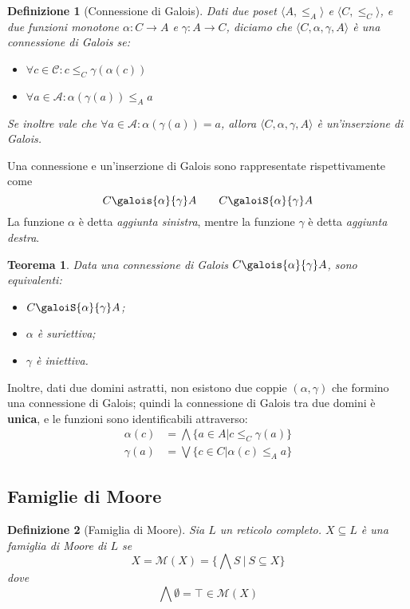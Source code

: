 \documentclass[a4paper, 11pt]{article}
\newcommand{\galoistuple}{\langle C, \alpha, \gamma , A \rangle}
\newtheorem{definit}{Definizione}[subsection]
\newtheorem{thm}{Teorema}[subsection]
\begin{document}
	\begin{definit}[Connessione di Galois]
		Dati due poset $\langle A , \leq_A \rangle$ e $\langle C , \leq_C \rangle$, e due funzioni monotone $\alpha: C \to A$ e $\gamma: A \to C$, diciamo che $\galoistuple$ è una connessione di Galois se:
		\begin{itemize}
			\item $\forall c \in \mathcal{C}: c \leq_C \gamma(\alpha(c))$
			\item $\forall a \in \mathcal{A}: \alpha(\gamma(a)) \leq_A a$
		\end{itemize}
		
		Se inoltre vale che $\forall a \in \mathcal{A}: \alpha(\gamma(a)) = a$, allora $\galoistuple$ è un'inserzione di Galois.
	\end{definit}
	Una connessione e un'inserzione di Galois sono rappresentate rispettivamente come \[  C \galois{\alpha}{\gamma} A \qquad C \galoiS{\alpha}{\gamma} A \]
	La funzione $\alpha$ è detta \textit{aggiunta sinistra}, mentre la funzione $\gamma$ è detta \textit{aggiunta destra}.
	
	\begin{thm}
		Data una connessione di Galois $ C \galois{\alpha}{\gamma} A$, sono equivalenti:
		\begin{itemize}
			\item $C \galoiS{\alpha}{\gamma} A$;
			\item $\alpha$ è suriettiva;
			\item $\gamma$ è iniettiva.
		\end{itemize}
	\end{thm}

	Inoltre, dati due domini astratti, non esistono due coppie $(\alpha, \gamma)$ che formino una connessione di Galois; quindi la connessione di Galois tra due domini è \textbf{unica}, e le funzioni sono identificabili attraverso:
	\begin{align*}
		\alpha(c) &= \bigwedge \lbrace a \in A \vert c \leq_C \gamma(a) \rbrace \\
		\gamma(a) &= \bigvee \lbrace c \in C \vert \alpha(c) \leq_A a \rbrace
	\end{align*}
	
	\subsection{Famiglie di Moore}
	\begin{definit}[Famiglia di Moore]
		Sia $L$ un reticolo completo. $X \subseteq L$ è una famiglia di Moore di $L$ se \[ X = \mathcal{M}(X) = \Big\{ \bigwedge S\ \vert\ S \subseteq X \Big\} \] dove \[ \bigwedge \emptyset = \top \in \mathcal{M}(X) \]
	\end{definit}
	
\end{document}
